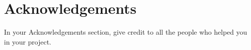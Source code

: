 \documentclass[]{UCD_CS_FYP_Report}
\begin{document}



\chapter*{Acknowledgements}
In your Acknowledgements section, give credit to all the people who helped you in your project.


\printbibliography


\end{document}
